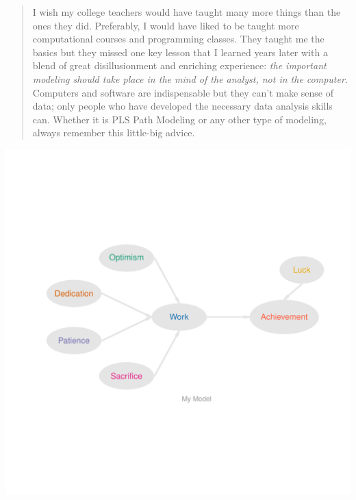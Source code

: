 \documentclass[12pt]{book}\usepackage{graphicx, color}
\makeatletter
\def\maxwidth{ %
  \ifdim\Gin@nat@width>\linewidth
    \linewidth
  \else
    \Gin@nat@width
  \fi
}
\newenvironment{knitrout}{}{} %
\makeatother
\begin{document}
\newpage
\thispagestyle{empty}
\begin{quotation} \noindent
I wish my college teachers would have taught many more things than the ones they did. Preferably, I would have liked to be taught more computational courses and programming classes. They taught me the basics but they missed one key lesson that I learned years later with a blend of great disillusionment and enriching experience: \textit{the important modeling should take place in the mind of the analyst, not in the computer}. Computers and software are indispensable but they can't make sense of data; only people who have developed the necessary data analysis skills can. Whether it is PLS Path Modeling or any other type of modeling, always remember this little-big advice.
\end{quotation}


\newpage

\begin{knitrout}
\color{fgcolor}
\includegraphics[width=\maxwidth]{figure/my_model} 

\end{knitrout}
\end{document}
